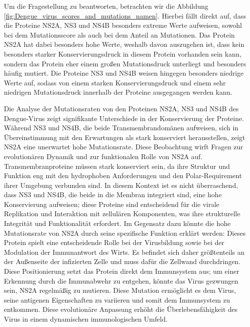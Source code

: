 \documentclass[german,version-2022-01]{uzl-thesis}
\begin{document}
Um die Fragestellung zu beantworten, betrachten wir die Abbildung \ref{fig:Dengue_virus_scores_and_mutations_namen}. Hierbei f\"allt direkt auf, dass die Proteine NS2A, NS3 und NS4B besonders extreme Werte aufweisen, sowohl bei dem Mutationsscore als auch bei dem Anteil an Mutationen. Das Protein NS2A hat dabei besonders hohe Werte, weshalb davon auszugehen ist, dass kein besonders starker Konservierungsdruck in diesem Protein vorhanden sein kann, sondern das Protein eher einem gro\ss{}en Mutationsdruck unterliegt und besonders h\"aufig mutiert. Die Proteine NS3 und NS4B weisen hingegen besonders niedrige Werte auf, sodass von einem starken Konservierungsdruck und einem sehr niedrigen Mutationsdruck innerhalb der Proteine ausgegangen werden kann. 

Die Analyse der Mutationsraten von den Proteinen NS2A, NS3 und NS4B des Dengue-Virus zeigt signifikante Unterschiede in der Konservierung der Proteine. W\"ahrend NS3 und NS4B, die beide Transmembrandom\"anen aufweisen, sich in \"Ubereinstimmung mit den Erwartungen als stark konserviert herausstellen, zeigt NS2A eine unerwartet hohe Mutationsrate. Diese Beobachtung wirft Fragen zur evolution\"aren Dynamik und zur funktionalen Rolle von NS2A auf. Transmembranproteine m\"ussen stark konserviert sein, da ihre Struktur und Funktion eng mit den hydrophoben Anforderungen und den Polar-Requirement ihrer Umgebung verbunden sind. In diesem Kontext ist es nicht \"uberraschend, dass NS3 und NS4B, die beide in die Membran integriert sind, eine hohe Konservierung aufweisen; diese Proteine sind entscheidend f\"ur die virale Replikation und Interaktion mit zellul\"aren Komponenten, was ihre strukturelle Integrit\"at und Funktionalit\"at erfordert. Im Gegensatz dazu k\"onnte die hohe Mutationsrate von NS2A durch seine spezifische Funktion erkl\"art werden: Dieses Protein spielt eine entscheidende Rolle bei der Virusbildung sowie bei der Modulation der Immunantwort des Wirts. Es befindet sich daher gr\"o\ss{}tenteils an der Au\ss{}enseite der infizierten Zelle und muss daf\"ur die Zellwand durchdringen. Diese Positionierung setzt das Protein direkt dem Immunsystem aus; um einer Erkennung durch die Immunabwehr zu entgehen, k\"onnte das Virus gezwungen sein, NS2A regelm\"a\ss{}ig zu mutieren. Diese Mutation erm\"oglicht es dem Virus, seine antigenen Eigenschaften zu variieren und somit dem Immunsystem zu entkommen. Diese evolution\"are Anpassung erh\"oht die \"Uberlebensf\"ahigkeit des Virus in einem dynamischen immunologischen Umfeld.
\end{document}

